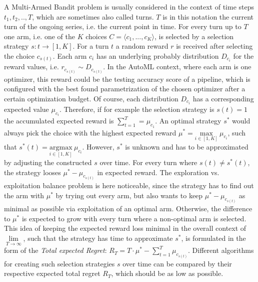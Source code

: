 A Multi-Armed Bandit problem is usually considered in the context of time steps $t_1, t_2, .., T$, which are sometimes also called turns.
$T$ is in this notation the current turn of the ongoing series, i.e. the current point in time.
For every turn up to $T$ one arm, i.e. one of the $K$ choices $C = \langle c_1, ..., c_K \rangle$, is selected by a selection strategy $s: t \rightarrow [1,K]$.\newline
For a turn $t$ a random reward $r$ is received after selecting the choice $c_{s(t)}$.
Each arm $c_i$ has an underlying probably distribution $D_{c_i}$ for the reward values, i.e. $r_{c_{s(t)}} \sim D_{c_{s(t)}}$.
In the AutoML context, where each arm is one optimizer, this reward could be the testing accuracy score of a pipeline, which is configured with the best found parametrization of the chosen optimizer after a certain optimization budget.\newline
Of course, each distribution $D_{c_i}$ has a corresponding expected value $\mu_{c_i}$.
Therefore, if for example the selection strategy is $s(t) = 1$ the accumulated expected reward is $\sum_{t=1}^T = \mu_{c_1}$.\newline
An optimal strategy $s^*$ would always pick the choice with the highest expected reward $\mu^* = \underset{i \in [1,K]}{\mathrm{max}} \> \mu_{c_i}$, such that $s^*(t) =\underset{i \in [1,K]}{\mathrm{argmax}} \> \mu_{c_i}$.
However, $s^*$ is unknown and has to be approximated by adjusting the constructed $s$ over time.\newline
For every turn where $s(t) \neq s^*(t)$, the strategy looses $\mu^* - \mu_{c_{s(t)}}$ in expected reward.
The exploration vs. exploitation balance problem is here noticeable, since the strategy has to find out the arm with $\mu^*$ by trying out every arm, but also wants to keep $\mu^* - \mu_{c_{s(t)}}$ as minimal as possible via exploitation of an optimal arm.
Otherwise, the difference to $\mu^*$ is expected to grow with every turn where a non-optimal arm is selected.
This idea of keeping the expected reward loss minimal in the overall context of $\underset{T \rightarrow \infty}{\lim}$, such that the strategy has time to approximate $s^*$, is formulated in the form of the \textit{Total expected Regret}: $R_T = T \cdot \mu^* - \sum_{t=1}^{T} \mu_{c_{s(t)}}$.
Different algorithms for creating such selection strategies $s$ over time can be compared by their respective expected total regret $R_T$, which should be as low as possible.

